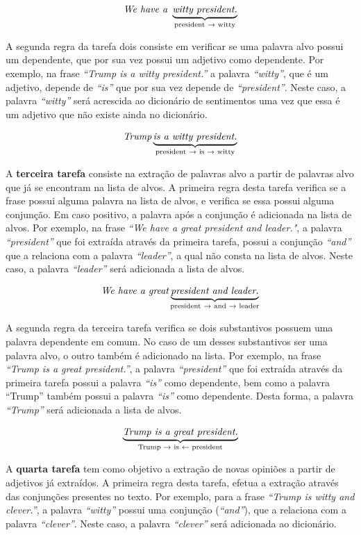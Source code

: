 \[\textit{We have a } \underbrace{\textit{witty president.}}_\text{president
\textrightarrow \text{ witty}}\]

A segunda regra da tarefa dois
consiste em verificar se uma palavra alvo possui um dependente, que por sua vez
possui um adjetivo como dependente. Por exemplo, na frase
\textit{``Trump is a witty president.''} a palavra \textit{``witty''}, que é um
adjetivo, depende de \textit{``is''} que por sua vez depende de
\textit{``president''}. Neste caso, a palavra \textit{``witty''}
será acrescida ao dicionário de sentimentos uma vez que essa é um adjetivo que
não existe ainda no dicionário.

\[\textit{Trump} \underbrace{\textit{is a witty president.}}_\text{president
\textrightarrow \text{ is} \textrightarrow \text{ witty}}\]

A \textbf{terceira tarefa} consiste na extração de palavras alvo a partir de
palavras alvo que já se encontram na lista de alvos. A primeira regra desta
tarefa verifica se a frase possui alguma palavra na lista de alvos, e verifica se essa possui alguma
conjunção. Em caso positivo, a palavra após a conjunção é adicionada na lista
de alvos. Por exemplo, na frase \textit{``We have a great president and
leader."}, a palavra \textit{``president''} que foi extraída através
da primeira tarefa, possui a conjunção \textit{``and''} que a relaciona com a
palavra \textit{``leader''}, a qual não consta na lista de alvos. Neste
caso, a palavra \textit{``leader''} será adicionada a lista de alvos.


\[\textit{We have a great} \underbrace{\textit{president and
leader.}}_\text{president \textrightarrow \text{ and} \textrightarrow \text{
leader}}\]

A segunda regra da terceira tarefa verifica se dois substantivos
possuem uma palavra dependente em comum. No caso de um desses substantivos ser
uma palavra alvo, o outro também é adicionado na lista. Por exemplo, na frase
\textit{``Trump is a great president.''}, a palavra \textit{``president''} que
foi extraída através da primeira tarefa possui a palavra \textit{``is''} como
dependente, bem como a palavra ``Trump'' também possui a palavra \textit{``is''}
como dependente. Desta forma, a palavra \textit{``Trump''} será adicionada a
lista de alvos.

\[\underbrace{\textit{Trump is a great president.}}_\text{Trump
\textrightarrow \text{ is} \textleftarrow \text{ president}}\]



A \textbf{quarta tarefa} tem como objetivo a extração de novas opiniões a partir
de adjetivos já extraídos. A primeira regra desta tarefa, efetua a extração através
das conjunções presentes no texto. Por exemplo, para a frase \textit{``Trump is
witty and clever.''}, a palavra \textit{``witty''} possui uma conjunção
(\textit{``and''}), que a relaciona com a palavra \textit{``clever''}. Neste
caso, a palavra \textit{``clever''} será adicionada ao dicionário.

